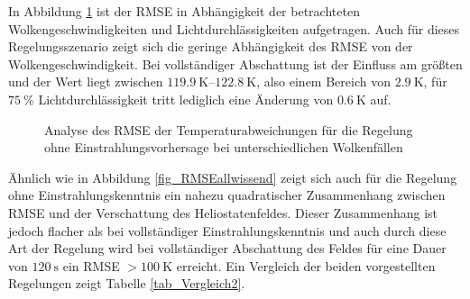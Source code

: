In Abbildung \ref{fig_RMSE3Dunwissend} ist der RMSE in Abhängigkeit der betrachteten Wolkengeschwindigkeiten und Lichtdurchlässigkeiten aufgetragen.
Auch für dieses Regelungsszenario zeigt sich die geringe Abhängigkeit des RMSE von der Wolkengeschwindigkeit.
Bei vollständiger Abschattung ist der Einfluss am größten und der Wert liegt zwischen $\SIrange{119.9}{122.8}{\kelvin}$, also einem Bereich von $\SI{2.9}{\kelvin}$, für $\SI{75}{\percent}$ Lichtdurchlässigkeit tritt lediglich eine Änderung von $\SI{0.6}{\kelvin}$ auf.

\begin{figure}[h!]
    \centering
    \setlength{\fboxsep}{1pt}
    \setlength{\fboxrule}{1pt}
    \caption[Analyse des RMSE der Temperaturabweichungen für die Regelung ohne Einstrahlungsvorhersage bei unterschiedlichen Wolkenfällen]{Analyse des RMSE der Temperaturabweichungen für die Regelung ohne Einstrahlungsvorhersage bei unterschiedlichen Wolkenfällen}
    \label{fig_RMSE3Dunwissend}
\end{figure}

Ähnlich wie in Abbildung \ref{fig_RMSEallwissend} zeigt sich auch für die Regelung ohne Einstrahlungskenntnis ein nahezu quadratischer Zusammenhang zwischen RMSE und der Verschattung des Heliostatenfeldes.
Dieser Zusammenhang ist jedoch flacher als bei vollständiger Einstrahlungskenntnis und auch durch diese Art der Regelung wird bei vollständiger Abschattung des Feldes für eine Dauer von $\SI{120}{\second}$ ein RMSE $>\SI{100}{\kelvin}$ erreicht.
Ein Vergleich der beiden vorgestellten Regelungen zeigt Tabelle \ref{tab_Vergleich2}.

